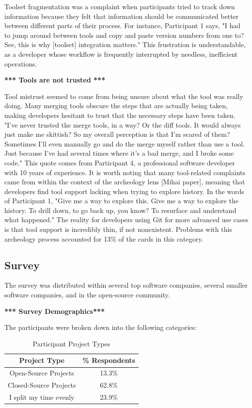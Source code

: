 \documentclass[conference]{IEEEtran}
\begin{document}
Toolset fragmentation was a complaint when participants tried to track down information because they felt that information should be communicated better between different parts of their process. For instance, Participant 1 says, "I had to jump around between tools and copy and paste version numbers from one to? See, this is why [toolset] integration matters." This frustration is understandable, as a developer whose workflow is frequently interrupted by needless, inefficient operations.

\textbf{*** Tools are not trusted ***}

Tool mistrust seemed to come from being unsure about what the tool was really doing. Many merging tools obscure the steps that are actually being taken, making developers hesitant to trust that the necessary steps have been taken. "I've never trusted the merge tools, in a way? Or the diff tools. It would always just make me skittish? So my overall perception is that I'm scared of them? Sometimes I'll even manually go and do the merge myself rather than use a tool. Just because I've had several times where it's a bad merge, and I broke some code." This quote comes from Participant 4, a professional software developer with 10 years of experience. 
It is worth noting that many tool-related complaints came from within the context of the archeology lens [Mihai paper], meaning that developers find tool support lacking when trying to explore history. In the words of Participant 1, "Give me a way to explore this. Give me a way to explore the history. To drill down, to go back up, you know? To resurface and understand what happened." The reality for developers using Git for more advanced use cases is that tool support is incredibly thin, if not nonexistent. Problems with this archeology process accounted for 13\% of the cards in this category.

\subsection{Survey}

The survey was distributed within several top software companies, several smaller software companies, and in the open-source community.

\textbf{*** Survey Demographics***}

The participants were broken down into the following categories:

\begin{table}[!t]
\renewcommand{\arraystretch}{1.3}
\caption{Participant Project Types}
\label{project_type}
\centering
\begin{tabular}{|c||c|}
\hline
Project Type & \% Respondents\\
\hline
Open-Source Projects & 13.3\%\\
Closed-Source Projects & 62.8\%\\
I split my time evenly & 23.9\%\\
\hline
\end{tabular}
\end{table}
\end{document}
